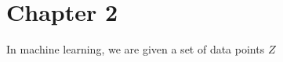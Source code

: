 \documentclass[thesis.tex]{subfiles}
\begin{document}
\chapter{Chapter 2}

\noindent
In machine learning, we are given a set of data points $Z$

\end{document}
